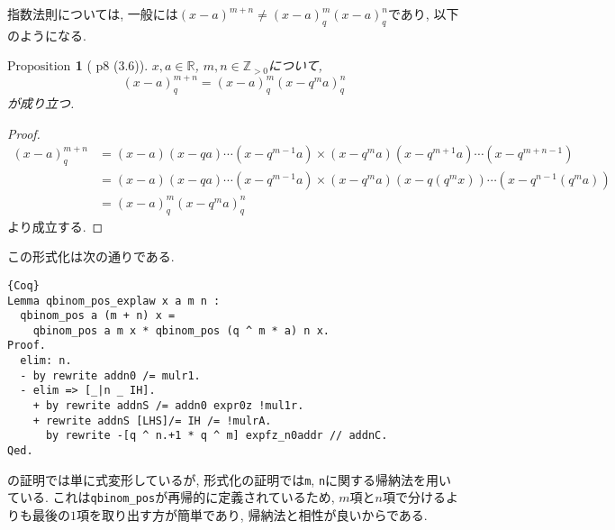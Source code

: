 \documentclass[11pt]{jsreport}
\theoremstyle{mystyle}
\newtheorem{prop}[df]{$\textrm{Proposition}$}
\newcommand{\bprop}{\begin{shadebox} \begin{prop}}
\newcommand{\eprop}{\end{prop} \end{shadebox}}
\newcommand{\bpf}{\begin{proof}}
\newcommand{\epf}{\end{proof}}
\newcommand{\Z}{\mathbb{Z}}
\newcommand{\R}{\mathbb{R}}
\newcommand{\0}{\textbf{0}}
\newcommand{\1}{\textbf{1}}
\newcommand{\2}{\textbf{2}}
\begin{document}
指数法則については, 一般には$(x - a)^{m + n} \neq (x - a)^m_q(x - a)^n_q$であり, 以下のようになる. 
\bprop[\cite{Kac} p8 (3.6)] \label{q_exp_low}
  $x,a\in\R$, $m,n\in\Z_{>0}$について, 
  \[
    (x-a)^{m+n}_q = (x-a)^m_q (x-q^ma)^n_q
  \]
  が成り立つ. 
\eprop
\bpf
  \begin{align*}
    (x-a)^{m+n}_q &= (x-a)(x-qa)\cdots(x-q^{m-1}a)
                         \times (x-q^ma)(x-q^{m+1}a)\cdots(x-q^{m+n-1})\\
                       &= (x-a)(x-qa)\cdots(x-q^{m-1}a)
                         \times (x-q^ma)(x-q(q^mx))\cdots(x-q^{n-1}(q^ma))\\
                       &= (x-a)^m_q(x-q^ma)^{n}_q
  \end{align*}
  より成立する.
\epf
この形式化は次の通りである. 
\begin{lstlisting}{Coq}
Lemma qbinom_pos_explaw x a m n :
  qbinom_pos a (m + n) x =
    qbinom_pos a m x * qbinom_pos (q ^ m * a) n x.
Proof.
  elim: n.
  - by rewrite addn0 /= mulr1.
  - elim => [_|n _ IH].
    + by rewrite addnS /= addn0 expr0z !mul1r.
    + rewrite addnS [LHS]/= IH /= !mulrA.
      by rewrite -[q ^ n.+1 * q ^ m] expfz_n0addr // addnC.
Qed.
\end{lstlisting}
\cite{Kac}の証明では単に式変形しているが, 形式化の証明では{\tt m}, {\tt n}に関する帰納法を用いている. これは{\tt qbinom\_pos}が再帰的に定義されているため, $m$項と$n$項で分けるよりも最後の$1$項を取り出す方が簡単であり, 帰納法と相性が良いからである. 
\end{document}

